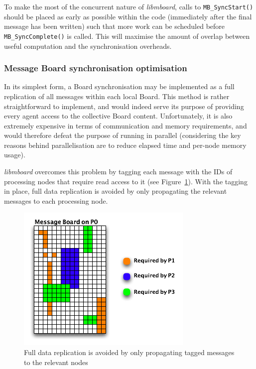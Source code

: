 To make the most of the concurrent nature of \textit{libmboard}, calls to \texttt{MB\_SyncStart()} should be placed as early as possible within the code (immediately after the final message has been written) such that more work can be scheduled before \texttt{MB\_SyncComplete()} is called. This will maximise the amount of overlap between useful computation and the synchronisation overheads.

\subsubsection{Message Board synchronisation optimisation}
\label{sec:mb_tagging}

In its simplest form, a Board synchronisation may be implemented as a full replication of all messages within each local Board. This method is rather straightforward to implement, and would indeed serve its purpose of providing every agent access to the collective Board content. Unfortunately, it is also extremely expensive in terms of communication and memory requirements, and would therefore defeat the purpose of running in parallel (considering the key reasons behind parallelisation are to reduce elapsed time and per-node memory usage).

\textit{libmboard} overcomes this problem by tagging each message with the IDs of processing nodes that require read access to it (see Figure~\ref{fig:taggedboard}). With the tagging in place, full data replication is avoided by only propagating the relevant messages to each processing node.

\begin{figure}[ht]
 \centering
  \includegraphics[scale=0.70]{taggedboard.png}
 \caption{Full data replication is avoided by only propagating tagged messages to the relevant nodes}
 \label{fig:taggedboard}
\end{figure}


